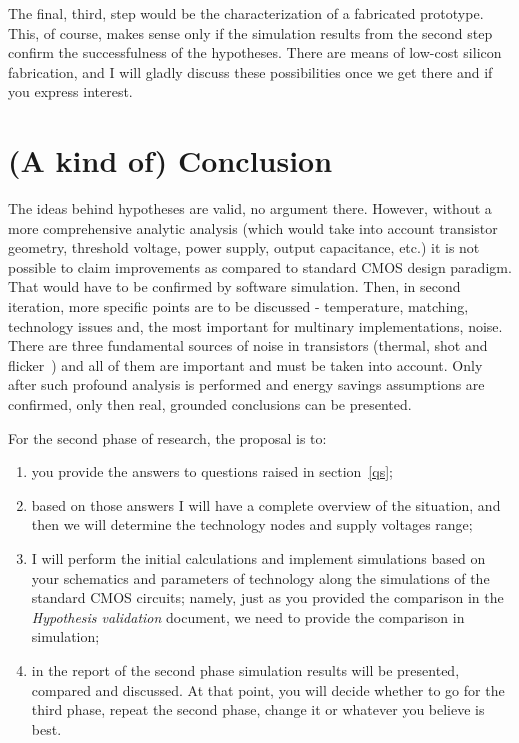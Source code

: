 \documentclass[12pt]{article}
\begin{document}
The final, third, step would be the characterization of a fabricated prototype. This, of course, makes sense only if the simulation results from the second step confirm the successfulness of the hypotheses. There are means of low-cost silicon fabrication, and I will gladly discuss these possibilities once we get there and if you express interest.

\section{(A kind of) Conclusion}

The ideas behind hypotheses are valid, no argument there. However, without a more comprehensive analytic analysis (which would take into account transistor geometry, threshold voltage, power supply, output capacitance, etc.) it is not possible to claim improvements as compared to standard CMOS design paradigm. That would have to be confirmed by software simulation. Then, in second iteration, more specific points are to be discussed - temperature, matching, technology issues and, the most important for multinary implementations, noise. There are three fundamental sources of noise in transistors (thermal, shot and flicker~\cite{Schneider:2010}) and all of them are important and must be taken into account. Only after such profound analysis is performed and energy savings assumptions are confirmed, only then real, grounded conclusions can be presented.

For the second phase of research, the proposal is to:
\begin{enumerate}
\item you provide the answers to questions raised in section~\ref{qs};
\item based on those answers I will have a complete overview of the situation, and then we will determine the technology nodes and supply voltages range;
\item I will perform the initial calculations and implement simulations based on your schematics and parameters of technology along the simulations of the standard CMOS circuits; namely, just as you provided the comparison in the \textit{Hypothesis validation} document, we need to provide the comparison in simulation;
\item in the report of the second phase simulation results will be presented, compared and discussed. At that point, you will decide whether to go for the third phase, repeat the second phase, change it or whatever you believe is best.
\end{enumerate}
\end{document}
